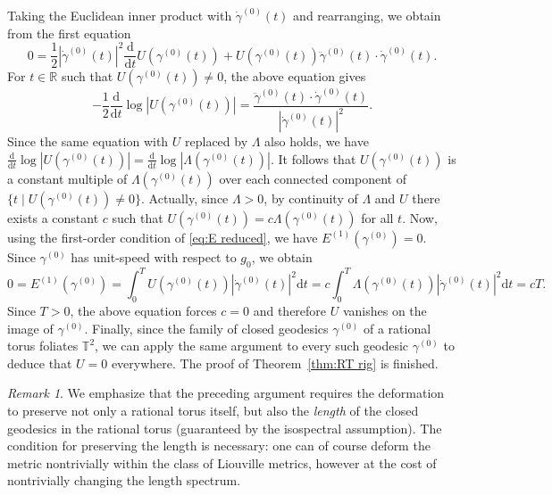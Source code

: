 \documentclass[11pt,letterpaper,oneside]{amsart}
\newcommand{\R}{\mathbb{R}}
\newcommand{\T}{\mathbb{T}}
\theoremstyle{definition}
\theoremstyle{remark}
\newtheorem{rema}[theo]{Remark}
\theoremstyle{definition}
\theoremstyle{remark}
\newcommand{\dif}{\mathrm{d}}
\begin{document}
Taking the Euclidean inner product with $\dot \gamma^{(0)}(t)$ and rearranging, we obtain from the first equation
\begin{equation*}
    0 = \frac{1}{2} |\dot \gamma^{(0)}(t)|^2 \frac{\dif}{\dif t} U(\gamma^{(0)}(t) ) + U(\gamma^{(0)}(t) ) \ddot \gamma^{(0)}(t) \cdot \dot \gamma^{(0)}(t).
\end{equation*}
For $t \in \R$ such that $U(\gamma^{(0)}(t)) \neq 0$, the above equation gives
\begin{equation*}
    -\frac{1}{2} \frac{\dif }{\dif t} \log |U(\gamma^{(0)}(t))| = \frac{\ddot \gamma^{(0)}(t) \cdot \dot \gamma^{(0)}(t)}{|\dot \gamma^{(0)}(t)|^2}.
\end{equation*}
Since the same equation with $U$ replaced by $\Lambda$ also holds, we have $\frac{\dif }{\dif t} \log |U(\gamma^{(0)}(t))| = \frac{\dif }{\dif t} \log |\Lambda(\gamma^{(0)}(t))|$.
It follows that $U(\gamma^{(0)}(t))$ is a constant multiple of $\Lambda(\gamma^{(0)}(t))$ over each connected component of $\{t \mid U(\gamma^{(0)}(t)) \neq 0\}$.
Actually, since $\Lambda > 0$, by continuity of $\Lambda$ and $U$ there exists a constant $c $ such that $U(\gamma^{(0)}(t)) = c \Lambda(\gamma^{(0)}(t))$ for all $t$.
Now, using the first-order condition of \eqref{eq:E reduced}, we have $E^{(1)}(\gamma^{(0)}) = 0$.
Since $\gamma^{(0)}$ has unit-speed with respect to $g_0$, we obtain 
\begin{equation}\label{eq:c=0}
    0 = E^{(1)}(\gamma^{(0)}) = \int_0^T U(\gamma^{(0)}(t)) |\dot \gamma^{(0)}(t)|^2 \dif t = c\int_0^T \Lambda(\gamma^{(0)}(t)) |\dot \gamma^{(0)}(t)|^2 \dif t
        = c T.
\end{equation}
Since $T > 0$, the above equation forces $c = 0$ and therefore $U$ vanishes on the image of $\gamma^{(0)}$.
Finally, since the family of closed geodesics $\gamma^{(0)}$ of a rational torus foliates $\T^2$, we can apply the same argument to every such geodesic $\gamma^{(0)}$ to deduce that $U = 0$ everywhere. 
The proof of Theorem~\ref{thm:RT rig} is finished.

\begin{rema}
    We emphasize that the preceding argument requires the deformation to preserve not only a rational torus itself, but also the \emph{length} of the closed geodesics in the rational torus (guaranteed by the isospectral assumption).
    The condition for preserving the length is necessary: one can of course deform the metric nontrivially within the class of Liouville metrics, however at the cost of nontrivially changing the length spectrum.
\end{rema}
\end{document}
